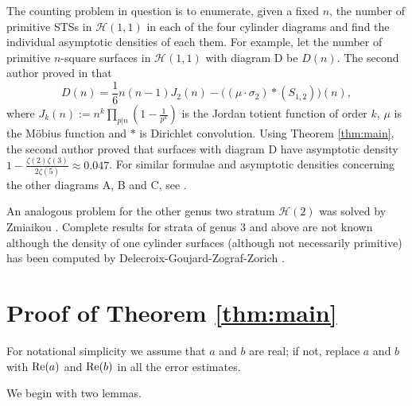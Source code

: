 \documentclass[12pt]{amsart}
\numberwithin{equation}{section}
\numberwithin{theorem}{section}
\newcommand{\calH}{\mathcal{H}}
\renewcommand\Re{\textnormal{Re}}
\begin{document}
The counting problem in question is to enumerate, given a fixed $n$, the number of primitive STSs in $\calH(1,1)$ in each of the four cylinder diagrams and find the individual asymptotic densities of each them. For example, let the number of primitive $n$-square surfaces in $\calH(1,1)$ with diagram D be $D(n)$. The second author proved in \cite{Shres} that 
$$D(n) = \frac{1}{6}n(n-1)J_2(n) - \bigl((\mu \cdot \sigma_2) * (S_{1,2})\bigr)(n),$$
where $J_k(n) := n^k \prod_{p | n} \left(1 - \frac{1}{p^k}\right)$ is the Jordan totient function of order $k$, $\mu$ is the M\"{o}bius function and $*$ is Dirichlet convolution. Using Theorem \ref{thm:main}, 
the second author proved that surfaces with diagram D have asymptotic density $1- \frac{\zeta(2)\zeta(3)}{2\zeta(5)} \approx 0.047$. For similar formulae and asymptotic densities concerning the other diagrams A, B and C, see \cite[Theorem 1.1]{Shres}.

An analogous problem for the other genus two stratum $\calH(2)$ was solved by Zmiaikou \cite{Zmi}. Complete results for strata of genus 3 and above are not known although the density of one cylinder surfaces (although not necessarily primitive) has been computed by Delecroix-Goujard-Zograf-Zorich \cite{DelGouZogZor}. 




\section{Proof of Theorem \ref{thm:main}}

For notational simplicity we assume that $a$ and $b$ are real; if not, replace $a$ and $b$ with $\Re(a)$ and $\Re(b)$ in all the error estimates.

We begin with two lemmas.
\end{document}

